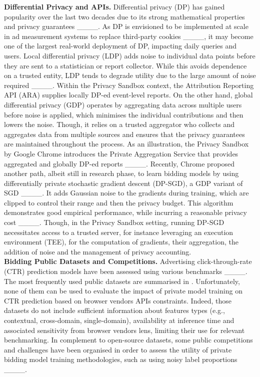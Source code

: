\noindent \textbf{Differential Privacy and APIs.} Differential privacy (DP) has gained popularity over the last two decades due to its strong mathematical properties and privacy guarantees ____. 
As DP is envisioned to be implemented at scale in ad measurement systems to replace third-party cookies ____, it may become one of the largest real-world deployment of DP, impacting daily queries and users. 
Local differential privacy (LDP) adds noise to individual data points before they are sent to a statistician or report collector. 
While this avoids dependence on a trusted entity, LDP tends to degrade utility due to the large amount of noise required ____. Within the Privacy Sandbox context, the Attribution Reporting API (ARA) supplies locally DP-ed event-level reports.  
On the other hand, global differential privacy (GDP) operates by aggregating data across multiple users before noise is applied, which minimises the individual contributions and then lowers the noise. Though, it relies on a trusted aggregator who collects and aggregates data from multiple sources and ensures that the privacy guarantees are maintained throughout the process. 
As an illustration, the Privacy Sandbox by Google Chrome introduces the Private Aggregation Service that provides aggregated and globally DP-ed reports ____. 
Recently, Chrome proposed another path, albeit still in research phase, to learn bidding models by using differentially private stochastic gradient descent (DP-SGD), a GDP variant of SGD ____. 
It adds Gaussian noise to the gradients during training, which are clipped to control their range and then the privacy budget. This algorithm demonstrates good empirical performance, while incurring a reasonable privacy cost ____. Though, in the Privacy Sandbox setting, running DP-SGD necessitates access to a trusted server, for instance leveraging an execution environment (TEE), for the computation of gradients, their aggregation, the addition of noise and the management of privacy accounting.\\


\noindent \textbf{Bidding Public Datasets and Competitions.}
Advertising click-through-rate (CTR) prediction models have been assessed using various benchmarks ____. 
The most frequently used public datasets are summarised in .
Unfortunately, none of them can be used to evaluate the impact of private model training on CTR prediction based on browser vendors APIs constraints. 
Indeed, those datasets do not include sufficient information about features types (e.g., contextual, cross-domain, single-domain), availability at inference time and associated sensitivity from browser vendors lens, limiting their use for relevant benchmarking.
In complement to open-source datasets, some public competitions and challenges have been organised in order to assess the utility of private bidding model training methodologies, such as using noisy label proportions ____.